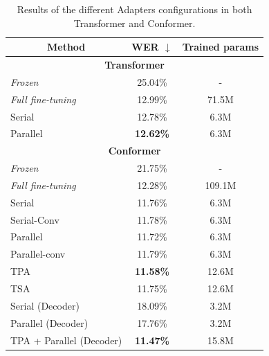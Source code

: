 \begin{table}[t]
\begin{center}    
\begin{tabular}{ccc}
\hline
 Method & WER $\downarrow$     & Trained params    \\ \hline \hline
\multicolumn{3}{c}{\textbf{Transformer}} \\ \hline
\multicolumn{1}{l}{\textit{Frozen}} & 25.04\%   & - \\
\multicolumn{1}{l}{\textit{Full fine-tuning}} & 12.99\% & 71.5M \\ \hline
\multicolumn{1}{l}{Serial}  &   12.78\% & 6.3M  \\ 
\multicolumn{1}{l}{Parallel}  &     \textbf{12.62\%} & 6.3M  \\ \hline\hline
\multicolumn{3}{c}{\textbf{Conformer}} \\ \hline
\multicolumn{1}{l}{\textit{Frozen}} & 21.75\%   & - \\ 
\multicolumn{1}{l}{\textit{Full fine-tuning}} & 12.28\% & 109.1M \\ \hline
\multicolumn{1}{l}{Serial}  &   11.76\% & 6.3M  \\ %
\multicolumn{1}{l}{Serial-Conv} & 11.78\%     & 6.3M  \\
\multicolumn{1}{l}{Parallel}    & 11.72\% & 6.3M  \\ %
\multicolumn{1}{l}{Parallel-conv} & 11.79\%      & 6.3M  \\ %
\multicolumn{1}{l}{TPA} & \textbf{11.58\%}     & 12.6M  \\ %
\multicolumn{1}{l}{TSA} & 11.75\%     & 12.6M  \\ \hline %
\multicolumn{1}{l}{Serial (Decoder)} & 18.09\%     & 3.2M  \\ 
\multicolumn{1}{l}{Parallel (Decoder)} &17.76\%     & 3.2M  \\ \hline
\multicolumn{1}{l}{TPA + Parallel (Decoder)} & \textbf{11.47\%}     & 15.8M  \\ \hline

\end{tabular}
\end{center}
\caption{Results of the different Adapters configurations in both Transformer and Conformer.}
\label{tab:res_config}
\end{table}

